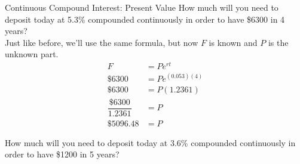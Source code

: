 \begin{example}[https://www.youtube.com/watch?v=vzk6AvZS3h8]{Continuous Compound Interest: Present Value}
How much will you need to deposit today at 5.3\% compounded continuously in order to have \$6300 in 4 years?\\

Just like before, we'll use the same formula, but now $F$ is known and $P$ is the unknown part.
\begin{align*}
F &= Pe^{rt}\\
\$6300 &= Pe^{(0.053)(4)}\\
\$6300 &= P(1.2361)\\
\dfrac{\$6300}{1.2361} &= P\\
\$5096.48 &= P
\end{align*}
\end{example}

\begin{try}
How much will you need to deposit today at 3.6\% compounded continuously in order to have \$1200 in 5 years?
\end{try}
\vfill
\pagebreak


